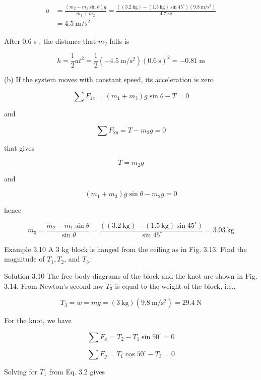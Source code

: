 \documentclass[10pt]{article}
\begin{document}
$$
\begin{aligned}
a & =\frac{\left(m_{2}-m_{1} \sin \theta\right) g}{m_{1}+m_{2}}=\frac{\left((3.2 \mathrm{~kg})-(1.5 \mathrm{~kg}) \sin 45^{\circ}\right)\left(9.8 \mathrm{~m} / \mathrm{s}^{2}\right)}{4.7 \mathrm{~kg}} \\
& =4.5 \mathrm{~m} / \mathrm{s}^{2}
\end{aligned}
$$

After 0.6 s , the distance that $m_{2}$ falls is

$$
h=\frac{1}{2} a t^{2}=\frac{1}{2}\left(-4.5 \mathrm{~m} / \mathrm{s}^{2}\right)(0.6 \mathrm{~s})^{2}=-0.81 \mathrm{~m}
$$

(b) If the system moves with constant speed, its acceleration is zero

$$
\sum F_{1 x}=\left(m_{1}+m_{3}\right) g \sin \theta-T=0
$$

and

$$
\sum F_{2 y}=T-m_{2} g=0
$$

that gives

$$
T=m_{2} g
$$

and

$$
\left(m_{1}+m_{3}\right) g \sin \theta-m_{2} g=0
$$

hence

$$
m_{3}=\frac{m_{2}-m_{1} \sin \theta}{\sin \theta}=\frac{\left((3.2 \mathrm{~kg})-(1.5 \mathrm{~kg}) \sin 45^{\circ}\right)}{\sin 45^{\circ}}=3.03 \mathrm{~kg}
$$

Example 3.10 A 3 kg block is hanged from the ceiling as in Fig. 3.13. Find the magnitude of $T_{1}, T_{2}$, and $T_{3}$.

Solution 3.10 The free-body diagrams of the block and the knot are shown in Fig. 3.14. From Newton's second law $T_{3}$ is equal to the weight of the block, i.e.,

$$
T_{3}=w=m g=(3 \mathrm{~kg})\left(9.8 \mathrm{~m} / \mathrm{s}^{2}\right)=29.4 \mathrm{~N}
$$

For the knot, we have


\begin{equation*}
\sum F_{x}=T_{2}-T_{1} \sin 50^{\circ}=0 \tag{3.1}
\end{equation*}



\begin{equation*}
\sum F_{y}=T_{1} \cos 50^{\circ}-T_{3}=0 \tag{3.2}
\end{equation*}


Solving for $T_{1}$ from Eq. 3.2 gives
\end{document}
